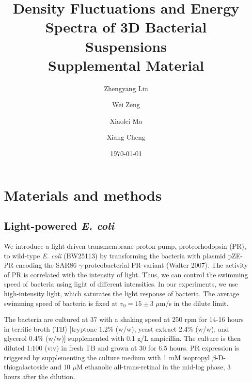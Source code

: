 \documentclass[twocolumn,aps,prx,amsmath,amssymb,longbibliography]{revtex4-2}
\date{\today}
\begin{document}
\title{Density Fluctuations and Energy Spectra of 3D Bacterial Suspensions\\
        Supplemental Material}


\author{Zhengyang Liu}
\author{Wei Zeng}
\author{Xiaolei Ma}
\author{Xiang Cheng}




\maketitle


\section{Materials and methods}
\subsection{Light-powered \textit{E. coli}}
We introduce a light-driven transmembrane proton pump, proteorhodopsin (PR), to wild-type \textit{E. coli} (BW25113) by transforming the bacteria with plasmid pZE-PR encoding the SAR86 $\gamma$-proteobacterial PR-variant (Walter 2007). The activity of PR is correlated with the intensity of light. Thus, we can control the swimming speed of bacteria using light of different intensities. In our experiments, we use high-intensity light, which saturates the light response of bacteria. The average swimming speed of bacteria is fixed at $v_0 = 15 \pm 3$ $\mu$m/s in the dilute limit.

The bacteria are cultured at 37 \textcelsius{} with a shaking speed at 250 rpm for 14-16 hours in terrific broth (TB) [tryptone 1.2\% (w/w), yeast extract 2.4\% (w/w), and glycerol 0.4\% (w/w)] supplemented with 0.1 g/L ampicillin. The culture is then diluted 1:100 (v:v) in fresh TB and grown at 30 \textcelsius{} for 6.5 hours. PR expression is triggered by supplementing the culture medium with 1 mM isopropyl $\beta$-D-thiogalactoside and 10  $\mu$M ethanolic all-trans-retinal in the mid-log phase, 3 hours after the dilution.
\end{document}
